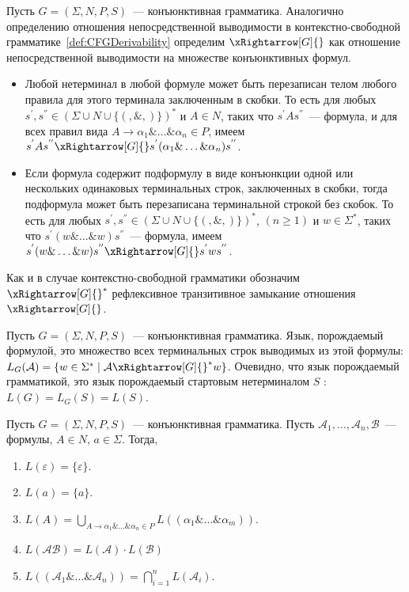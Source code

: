 \begin{definition}
    Пусть $G = (\Sigma,N,P,S)$~--- конъюнктивная грамматика. Аналогично определению отношения непосредственной выводимости в контекстно-свободной грамматике~\ref{def:CFGDerivability} определим $\xRightarrow[G]{}$ как отношение непосредственной выводимости на множестве конъюнктивных формул.
    \begin{itemize}
        \item Любой нетерминал в любой формуле может быть перезаписан телом любого правила для этого терминала заключенным в скобки. То есть для любых $s^{'},s^{''} \in (\Sigma \cup N \cup \{(, \&, )\})^*$ и $A\in N$, таких что $s^{'}As^{''}$~--- формула, и для всех правил вида $A \rightarrow \alpha_1\&\ldots\&\alpha_n \in P$, имеем $s^{'}As^{''}\xRightarrow[G]{}s^{'}(\alpha_1\&\ldots\&\alpha_n)s^{''}$.
        \item Если формула содержит подформулу в виде конъюнкции одной или нескольких одинаковых терминальных строк, заключенных в скобки, тогда подформула может быть перезаписана терминальной строкой без скобок. То есть для любых $s^{'},s^{''} \in (\Sigma \cup N \cup \{(, \&, )\})^*$, $(n \geqslant 1)$ и $w \in \Sigma^*$, таких что $s^{'}(w\&\ldots\&w)s^{''}$~--- формула, имеем $s^{'}(w\&\ldots\&w)s^{''}\xRightarrow[G]{}s^{'}ws^{''}$.
    \end{itemize}
\end{definition}

Как и в случае контекстно-свободной грамматики обозначим $\xRightarrow[G]{}^*$ рефлексивное транзитивное замыкание отношения $\xRightarrow[G]{}$.

\begin{definition}
    Пусть $G = (\Sigma,N,P,S)$~--- конъюнктивная грамматика. Язык, порождаемый формулой, это множество всех терминальных строк выводимых из этой формулы: $L_{G}(\mathcal{A}) = \{w\in\Sigma^* \mid \mathcal{A} \xRightarrow[G]{}^*w\}$. Очевидно, что язык порождаемый грамматикой, это язык порождаемый стартовым нетерминалом $S$ : $L(G) = L_{G}(S) = L(S)$.
\end{definition}

\begin{theorem}\label{thm:ConjunctiveFormulaLanguage}
    Пусть $G = (\Sigma,N,P,S)$~--- конъюнктивная грамматика. Пусть $\mathcal{A}_1,\ldots,\mathcal{A}_n,\mathcal{B}$~--- формулы, $A \in N$, $a \in \Sigma$. Тогда,
    \begin{enumerate}
        \item $L(\varepsilon) = \{\varepsilon\}$.
        \item $L(a) = \{a\}$.
        \item $L(A) = \bigcup_{A \rightarrow \alpha_1\&\ldots\&\alpha_n \in P} L((\alpha_1\&\ldots\&\alpha_m))$.
        \item $L(\mathcal{AB}) = L(\mathcal{A}) \cdot L(\mathcal{B})$
        \item $L((\mathcal{A}_1\&\ldots\&\mathcal{A}_n)) = \bigcap_{i = 1}^{n}L(\mathcal{A}_i)$.
    \end{enumerate}
\end{theorem}

